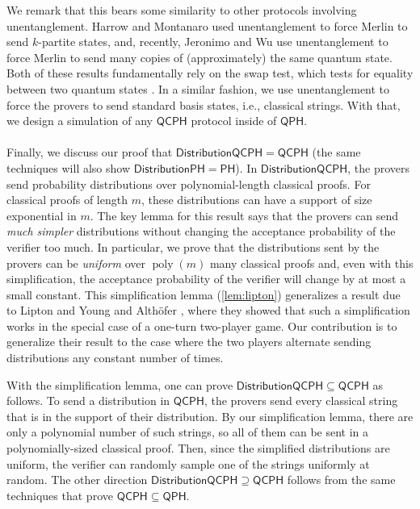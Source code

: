 \documentclass[11pt]{article}
\theoremstyle{definition}
\DeclareMathOperator{\poly}{poly}
\newcommand{\class}[1]{\ensuremath{\mathsf{#1}}\xspace}
\newcommand{\PH}{\class{PH}}
\newcommand{\QCPH}{\class{QCPH}}
\newcommand{\QPH}{\class{QPH}}
\newcommand{\distributionPH}{\mixedPH}
\newcommand{\distributionQCPH}{\mathsf{DistributionQCPH}}
\newcommand{\mixedPH}{\class{DistributionPH}}
\begin{document}
We remark that this bears some similarity to other protocols involving unentanglement. 
Harrow and Montanaro \cite{harrow2013testing} used unentanglement to force Merlin to send $k$-partite states, and, recently, Jeronimo and Wu \cite{jeronimo2023power} use unentanglement to force Merlin to send many copies of (approximately) the same quantum state. 
Both of these results fundamentally rely on the swap test, which tests for equality between two quantum states \cite{buhrman2001quantum}. 
In a similar fashion, we use unentanglement to force the provers to send standard basis states, i.e., classical strings. 
With that, we design a simulation of any $\QCPH$ protocol inside of $\QPH$. 

\paragraph{}


Finally, we discuss our proof that $\distributionQCPH = \QCPH$ (the same techniques will also show $\distributionPH = \PH$). 
In $\distributionQCPH$, the provers send probability distributions over polynomial-length classical proofs. 
For classical proofs of length $m$, these distributions can have a support of size exponential in $m$. 
The key lemma for this result says that the provers can send \emph{much simpler} distributions without changing the acceptance probability of the verifier too much. 
In particular, we prove that the distributions sent by the provers can be \emph{uniform} over $\poly(m)$ many classical proofs and, even with this simplification, the acceptance probability of the verifier will change by at most a small constant.  
This simplification lemma (\cref{lem:lipton}) generalizes a result due to Lipton and Young \cite{lipton1994simple} and Althöfer \cite{ALTHOFER1994339}, where they showed that such a simplification works in the special case of a one-turn two-player game. 
Our contribution is to generalize their result to the case where the two players alternate sending distributions any constant number of times.


With the simplification lemma, one can prove $\distributionQCPH \subseteq \QCPH$ as follows. 
To send a distribution in $\QCPH$, the provers send every classical string that is in the support of their distribution. By our simplification lemma, there are only a polynomial number of such strings, so all of them can be sent in a polynomially-sized classical proof.  
Then, since the simplified distributions are uniform, the verifier can randomly sample one of the strings uniformly at random.
The other direction $\distributionQCPH \supseteq \QCPH$ follows from the same techniques that prove $\QCPH \subseteq \QPH$. 
\end{document}
